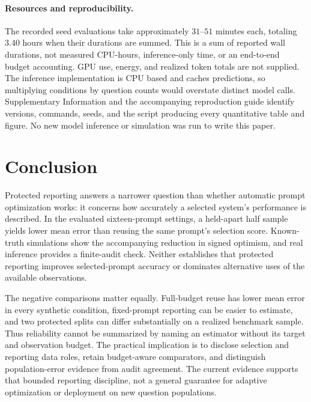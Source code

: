\documentclass{article}
\begin{document}
\paragraph{Resources and reproducibility.}
The recorded seed evaluations take approximately $31$--$51$ minutes each, totaling $3.40$ hours when their durations are summed. This is a sum of reported wall durations, not measured CPU-hours, inference-only time, or an end-to-end budget accounting. GPU use, energy, and realized token totals are not supplied. The inference implementation is CPU based and caches predictions, so multiplying conditions by question counts would overstate distinct model calls. Supplementary Information and the accompanying reproduction guide identify versions, commands, seeds, and the script producing every quantitative table and figure. No new model inference or simulation was run to write this paper.

\section{Conclusion}
Protected reporting answers a narrower question than whether automatic prompt optimization works: it concerns how accurately a selected system's performance is described. In the evaluated sixteen-prompt settings, a held-apart half sample yields lower mean error than reusing the same prompt's selection score. Known-truth simulations show the accompanying reduction in signed optimism, and real inference provides a finite-audit check. Neither establishes that protected reporting improves selected-prompt accuracy or dominates alternative uses of the available observations.

The negative comparisons matter equally. Full-budget reuse has lower mean error in every synthetic condition, fixed-prompt reporting can be easier to estimate, and two protected splits can differ substantially on a realized benchmark sample. Thus reliability cannot be summarized by naming an estimator without its target and observation budget. The practical implication is to disclose selection and reporting data roles, retain budget-aware comparators, and distinguish population-error evidence from audit agreement. The current evidence supports that bounded reporting discipline, not a general guarantee for adaptive optimization or deployment on new question populations.
\end{document}
